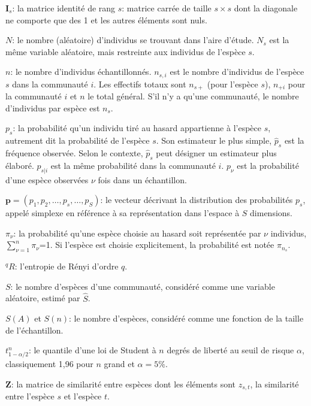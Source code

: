 \documentclass[
  11pt,
  american,
  a4paper,
  extrafontsizes,onecolumn,openright
  ]{memoir}
\begin{document}
\noindent \(\mathbf{I}_s\): la matrice identité de rang \(s\): matrice carrée de taille \(s\times s\) dont la diagonale ne comporte que des 1 et les autres éléments sont nuls.

\noindent \(N\): le nombre (aléatoire) d'individus se trouvant dans l'aire d'étude.
\(N_s\) est la même variable aléatoire, mais restreinte aux individus de l'espèce \(s\).

\noindent \(n\): le nombre d'individus échantillonnés.
\(n_{s,i}\) est le nombre d'individus de l'espèce \(s\) dans la communauté \(i\).
Les effectifs totaux sont \(n_{s+}\) (pour l'espèce \(s\)), \(n_{+i}\) pour la communauté \(i\) et \(n\) le total général.
S'il n'y a qu'une communauté, le nombre d'individus par espèce est \(n_s\).

\noindent \(p_s\): la probabilité qu'un individu tiré au hasard appartienne à l'espèce \(s\), autrement dit la probabilité de l'espèce \(s\).
Son estimateur le plus simple, \({\hat{p}}_s\) est la fréquence observée.
Selon le contexte, \({\hat{p}}_s\) peut désigner un estimateur plus élaboré.
\(p_{s|i}\) est la même probabilité dans la communauté \(i\).
\(p_{\nu}\) est la probabilité d'une espèce observées \(\nu\) fois dans un échantillon.

\noindent \(\mathbf{p}=\left( p_1, p_2, \dots, p_s, \dots, p_S \right)\): le vecteur décrivant la distribution des probabilités \(p_s\), appelé simplexe en référence à sa représentation dans l'espace à \(S\) dimensions.

\noindent \({\pi}_{\nu}\): la probabilité qu'une espèce choisie au hasard soit représentée par \(\nu\) individus, \(\sum^n_{\nu=1}{{\pi}_{\nu}}\)=1.
Si l'espèce est choisie explicitement, la probabilité est notée \({\pi}_{n_s}\).

\noindent \(^{q}\!R\): l'entropie de Rényi d'ordre \(q\).

\noindent \(S\): le nombre d'espèces d'une communauté, considéré comme une variable aléatoire, estimé par \(\hat{S}\).

\noindent \(S(A)\) et \(S(n)\): le nombre d'espèces, considéré comme une fonction de la taille de l'échantillon.

\noindent \(t^{n}_{1-\alpha/2}\): le quantile d'une loi de Student à \(n\) degrés de liberté au seuil de risque \(\alpha\), classiquement 1,96 pour \(n\) grand et \(\alpha=5\%\).

\noindent \(\mathbf{Z}\): la matrice de similarité entre espèces dont les éléments sont \(z_{s,t}\), la similarité entre l'espèce \(s\) et l'espèce \(t\).
\end{document}
